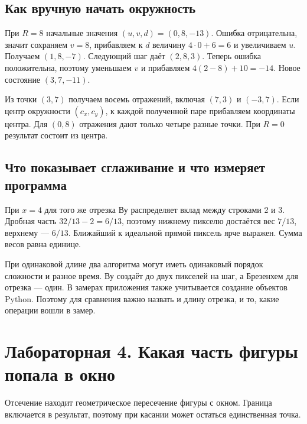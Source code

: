 \documentclass[11pt,a4paper]{extarticle}
\begin{document}
\subsection*{Как вручную начать окружность}
При $R=8$ начальные значения $(u,v,d)=(0,8,-13)$. Ошибка отрицательна, значит сохраняем $v=8$, прибавляем к $d$ величину $4\cdot0+6=6$ и увеличиваем $u$. Получаем $(1,8,-7)$. Следующий шаг даёт $(2,8,3)$. Теперь ошибка положительна, поэтому уменьшаем $v$ и прибавляем $4(2-8)+10=-14$. Новое состояние $(3,7,-11)$.

Из точки $(3,7)$ получаем восемь отражений, включая $(7,3)$ и $(-3,7)$. Если центр окружности $(c_x,c_y)$, к каждой полученной паре прибавляем координаты центра. Для $(0,8)$ отражения дают только четыре разные точки. При $R=0$ результат состоит из центра.

\subsection*{Что показывает сглаживание и что измеряет программа}
При $x=4$ для того же отрезка Ву распределяет вклад между строками 2 и 3. Дробная часть $32/13-2=6/13$, поэтому нижнему пикселю достаётся вес $7/13$, верхнему --- $6/13$. Ближайший к идеальной прямой пиксель ярче выражен. Сумма весов равна единице.

При одинаковой длине два алгоритма могут иметь одинаковый порядок сложности и разное время. Ву создаёт до двух пикселей на шаг, а Брезенхем для отрезка --- один. В замерах приложения также учитывается создание объектов Python. Поэтому для сравнения важно назвать и длину отрезка, и то, какие операции вошли в замер.

\clearpage
\section*{Лабораторная 4. Какая часть фигуры попала в окно}
Отсечение находит геометрическое пересечение фигуры с окном. Граница включается в результат, поэтому при касании может остаться единственная точка.
\end{document}
